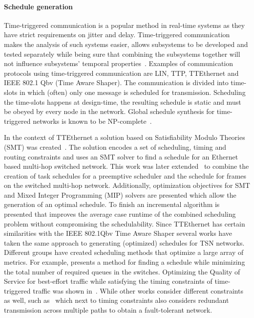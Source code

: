 \paragraph{Schedule generation}
Time-triggered communication is a popular method in real-time systems as they have strict requirements on jitter and delay. Time-triggered communication makes the analysis of such systems easier, allows subsystems to be developed and tested separately while being sure that combining the subsystems together will not influence subsystems' temporal properties~\cite{kopetz2003time}. Examples of communication protocols using time-triggered communication are LIN, TTP, TTEthernet and IEEE 802.1 Qbv (Time Aware Shaper). The communication is divided into time-slots in which (often) only one message is scheduled for transmission. Scheduling the time-slots happens at design-time, the resulting schedule is static and must be obeyed by every node in the network. Global schedule synthesis for time-triggered networks is known to be NP-complete~\cite{steiner2010evaluation}.

In the context of TTEthernet a solution based on Satisfiability Modulo Theories (SMT) was created~\cite{steiner2010evaluation}. The solution encodes a set of scheduling, timing and routing constraints and uses an SMT solver to find a schedule for an Ethernet based multi-hop switched network. This work was later extended~\cite{craciunas2016combined} to combine the creation of task schedules for a preemptive scheduler and the schedule for frames on the switched multi-hop network. Additionally, optimization objectives for SMT and Mixed Integer Programming (MIP) solvers are presented which allow the generation of an optimal schedule. To finish an incremental algorithm is presented that improves the average case runtime of the combined scheduling problem without compromising the schedulability. Since TTEthernet has certain similarities with the IEEE 802.1Qbv Time Aware Shaper several works have taken the same approach to generating (optimized) schedules for TSN networks. Different groups have created scheduling methods that optimize a large array of metrics. For example, \cite{craciunas2016scheduling} presents a method for finding a schedule while minimizing the total number of required queues in the switches. Optimizing the Quality of Service for best-effort traffic while satisfying the timing constraints of time-triggered traffic was shown in~\cite{houtan2021synthesising}. While other works consider different constraints as well, such as~\cite{gavrilut2017fault} which next to timing constraints also considers redundant transmission across multiple paths to obtain a fault-tolerant network.

